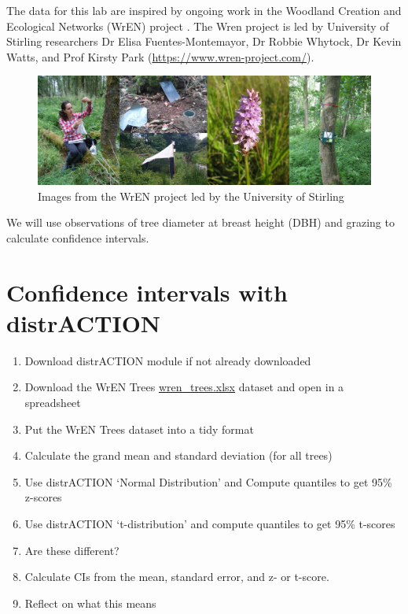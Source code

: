 \documentclass[
]{scrbook}
\providecommand{\tightlist}{%
  \setlength{\itemsep}{0pt}\setlength{\parskip}{0pt}}
\begin{document}
The data for this lab are inspired by ongoing work in the Woodland Creation and Ecological Networks (WrEN) project \citep{Fuentes-Montemayor2022, Fuentes-Montemayor2022a}.
The Wren project is led by University of Stirling researchers Dr Elisa Fuentes-Montemayor, Dr Robbie Whytock, Dr Kevin Watts, and Prof Kirsty Park (\url{https://www.wren-project.com/}).

\begin{figure}
\includegraphics[width=1\linewidth]{img/wren_project} \caption{Images from the WrEN project led by the University of Stirling}\label{fig:unnamed-chunk-86}
\end{figure}

We will use observations of tree diameter at breast height (DBH) and grazing to calculate confidence intervals.

\hypertarget{confidence-intervals-with-distraction}{%
\section{Confidence intervals with distrACTION}\label{confidence-intervals-with-distraction}}

\begin{enumerate}
\def\labelenumi{\arabic{enumi}.}
\tightlist
\item
  Download distrACTION module if not already downloaded
\item
  Download the WrEN Trees \href{https://raw.githubusercontent.com/bradduthie/statistical_techniques/main/data/wren_trees.xlsx}{wren\_trees.xlsx} dataset and open in a spreadsheet
\item
  Put the WrEN Trees dataset into a tidy format
\item
  Calculate the grand mean and standard deviation (for all trees)
\item
  Use distrACTION `Normal Distribution' and Compute quantiles to get 95\% z-scores
\item
  Use distrACTION `t-distribution' and compute quantiles to get 95\% t-scores
\item
  Are these different?
\item
  Calculate CIs from the mean, standard error, and z- or t-score.
\item
  Reflect on what this means
\end{enumerate}
\end{document}
